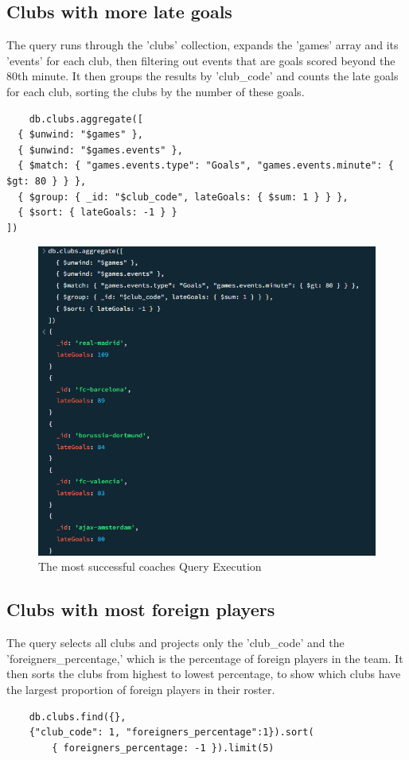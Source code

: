 \documentclass{Configuration_Files/PoliMi3i_thesis}
\begin{document}
\subsection{Clubs with more late goals}
The query runs through the 'clubs' collection, expands the 'games' array and its 'events' for each club, then filtering out events that are goals scored beyond the 80th minute. It then groups the results by 'club\_code' and counts the late goals for each club, sorting the clubs by the number of these goals.
\begin{verbatim}
    db.clubs.aggregate([
  { $unwind: "$games" },
  { $unwind: "$games.events" },
  { $match: { "games.events.type": "Goals", "games.events.minute": { $gt: 80 } } },
  { $group: { _id: "$club_code", lateGoals: { $sum: 1 } } },
  { $sort: { lateGoals: -1 } }
])
\end{verbatim}
\begin{figure}[htbp]
    \centering
    \includegraphics[scale=0.8]{Images/Queries/Clubs/late_goals_per_club/lgpc.png}
    \caption{The most successful coaches Query Execution}
\end{figure}
\subsection{Clubs with most foreign players}
The query selects all clubs and projects only the 'club\_code' and the 'foreigners\_percentage,' which is the percentage of foreign players in the team. It then sorts the clubs from highest to lowest percentage, to show which clubs have the largest proportion of foreign players in their roster.
\begin{verbatim}
    db.clubs.find({}, 
    {"club_code": 1, "foreigners_percentage":1}).sort(
        { foreigners_percentage: -1 }).limit(5)
\end{verbatim}
\end{document}
